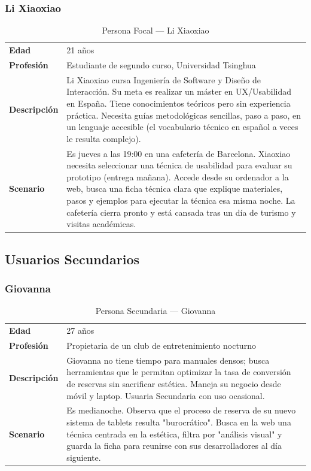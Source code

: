 \documentclass[12pt, a4paper]{report}
\begin{document}
\subsubsection{Li Xiaoxiao}

\begin{table}[H]
\centering
\begin{tabularx}{\linewidth}{lX}
\toprule
\textbf{Edad} & 21 años \\
\textbf{Profesión} & Estudiante de segundo curso, Universidad Tsinghua \\
\midrule
\textbf{Descripción} &
Li Xiaoxiao cursa Ingeniería de Software y Diseño de Interacción. Su meta es realizar un máster en
UX/Usabilidad en España. Tiene conocimientos teóricos pero sin experiencia práctica. Necesita
guías metodológicas sencillas, paso a paso, en un lenguaje accesible (el vocabulario técnico en
español a veces le resulta complejo). \\[4pt]
\textbf{Scenario} &
Es jueves a las 19:00 en una cafetería de Barcelona. Xiaoxiao necesita seleccionar una técnica de
usabilidad para evaluar su prototipo (entrega mañana). Accede desde su ordenador a la web,
busca una ficha técnica clara que explique materiales, pasos y ejemplos para ejecutar la técnica
esa misma noche. La cafetería cierra pronto y está cansada tras un día de turismo y visitas
académicas. \\
\bottomrule
\end{tabularx}
\caption{Persona Focal — Li Xiaoxiao}
\end{table}

\subsection{Usuarios Secundarios}

\subsubsection{Giovanna}

\begin{table}[H]
\centering
\begin{tabularx}{\linewidth}{lX}
\toprule
\textbf{Edad} & 27 años \\
\textbf{Profesión} & Propietaria de un club de entretenimiento nocturno \\
\midrule
\textbf{Descripción} &
Giovanna no tiene tiempo para manuales densos; busca herramientas que le permitan optimizar
la tasa de conversión de reservas sin sacrificar estética. Maneja su negocio desde móvil y laptop.
Usuaria Secundaria con uso ocasional. \\[4pt]
\textbf{Scenario} &
Es medianoche. Observa que el proceso de reserva de su nuevo sistema de tablets resulta
"burocrático". Busca en la web una técnica centrada en la estética, filtra por "análisis visual" y
guarda la ficha para reunirse con sus desarrolladores al día siguiente. \\
\bottomrule
\end{tabularx}
\caption{Persona Secundaria — Giovanna}
\end{table}
\end{document}
